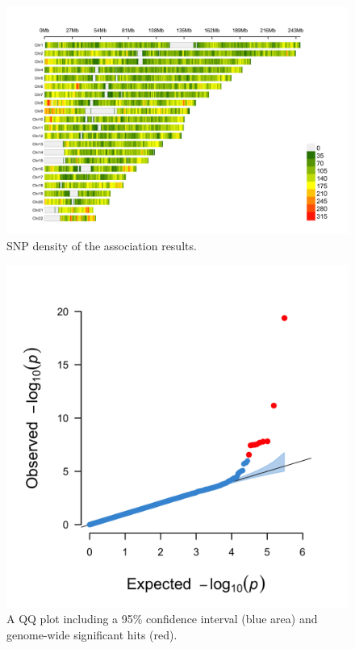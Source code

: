 \documentclass[
]{book}
\begin{document}
\begin{figure}[H]

{\centering \includegraphics[width=0.85\linewidth]{img/_gwas_dummy/show-cmplot-all-density} 

}

\caption{SNP density of the association results.}\label{fig:showcmplotalldensity}
\end{figure}

\begin{figure}[H]

{\centering \includegraphics[width=0.85\linewidth]{img/_gwas_dummy/show-cmplot-all-qq} 

}

\caption{A QQ plot including a 95\% confidence interval (blue area) and genome-wide significant hits (red).}\label{fig:showcmplotallqq}
\end{figure}
\end{document}
